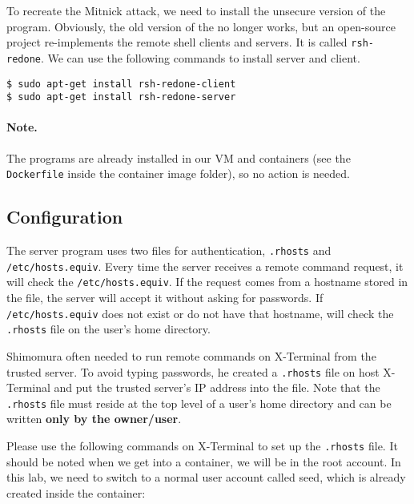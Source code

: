 To recreate the Mitnick attack, we need to install the unsecure version
of the \rsh program. Obviously, the old version of 
the \rsh no longer works, but an open-source project
re-implements the remote shell clients and servers. 
It is called \texttt{rsh-redone}. 
We can use the following commands to install \rsh server and client. 

\begin{lstlisting}
$ sudo apt-get install rsh-redone-client
$ sudo apt-get install rsh-redone-server
\end{lstlisting}

\paragraph{Note.} The \rsh programs are already installed in our 
VM and containers (see the \texttt{Dockerfile} inside the container image
folder), so no action is needed. 



\subsection{Configuration}
\label{subsec:configuration}

The \rsh server program uses two files for authentication, 
\texttt{.rhosts} and \texttt{/etc/hosts.equiv}.
Every time the server receives a remote command request, it will check
the \texttt{/etc/hosts.equiv}. If the request comes from a hostname stored in the file, the
server will accept it without asking for passwords. 
If \texttt{/etc/hosts.equiv} does not exist or
do not have that hostname, \rsh  will check the \texttt{.rhosts} file 
on the user's home directory. 

Shimomura often needed to run remote commands on X-Terminal
from the trusted server. To avoid typing passwords, he
created a \texttt{.rhosts} file on host X-Terminal and put the trusted
server's IP address into the file.
Note that the \texttt{.rhosts} file must reside at the top level of a user's home directory and
can be written \textbf{only by the owner/user}.


Please use the following commands on X-Terminal to set up the \texttt{.rhosts} file.
It should be noted when we get into a container, we will be in the root 
account. In this lab, we need to switch to a normal user account called seed, which
is already created inside the container: 

